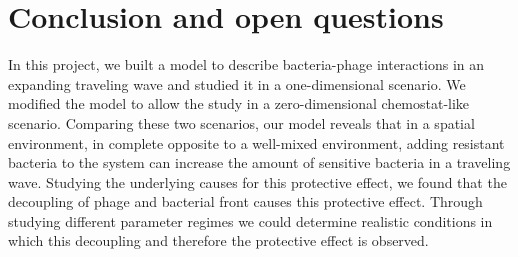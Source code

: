 \chapter{Conclusion and open questions}
\label{chap:conclusion}

In this project, we built a model to describe bacteria-phage interactions in an expanding traveling wave and studied it in a one-dimensional scenario. We modified the model to allow the study in a zero-dimensional chemostat-like scenario. 
Comparing these two scenarios, our model reveals that in a spatial environment, in complete opposite to a well-mixed environment, adding resistant bacteria to the system can increase the amount of sensitive bacteria in a traveling wave.
Studying the underlying causes for this protective effect, we found that the decoupling of phage and bacterial front causes this protective effect. Through studying different parameter regimes we could determine realistic conditions in which this decoupling and therefore the protective effect is observed.










